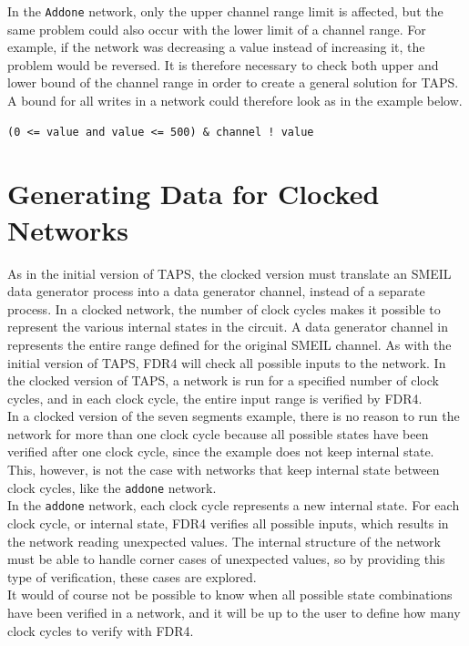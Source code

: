 In the \texttt{Addone} network, only the upper channel range limit is affected, but the same problem could also occur with the lower limit of a channel range. For example, if the network was decreasing a value instead of increasing it, the problem would be reversed. It is therefore necessary to check both upper and lower bound of the channel range in order to create a general solution for TAPS. A bound for all writes in a network could therefore look as in the example below.
\begin{verbatim}
(0 <= value and value <= 500) & channel ! value
\end{verbatim}
\section{Generating Data for Clocked Networks}
As in the initial version of TAPS, the clocked version must translate an SMEIL data generator process into a \cspm{} data generator channel, instead of a separate process. In a clocked network, the number of clock cycles makes it possible to represent the various internal states in the circuit.
A data generator channel in \cspm{} represents the entire range defined for the original SMEIL channel. As with the initial version of TAPS, FDR4 will check all possible inputs to the network.
In the clocked version of TAPS, a network is run for a specified number of clock cycles, and in each clock cycle, the entire input range is verified by FDR4.\\

In a clocked version of the seven segments example, there is no reason to run the network for more than one clock cycle because all possible states have been verified after one clock cycle, since the example does not keep internal state. This, however, is not the case with networks that keep internal state between clock cycles, like the \texttt{addone} network.\\

In the \texttt{addone} network, each clock cycle represents a new internal state. For each clock cycle, or internal state, FDR4 verifies all possible inputs, which results in the network reading unexpected values. The internal structure of the network must be able to handle corner cases of unexpected values, so by providing this type of verification, these cases are explored. \\

It would of course not be possible to know when all possible state combinations have been verified in a network, and it will be up to the user to define how many clock cycles to verify with FDR4.
